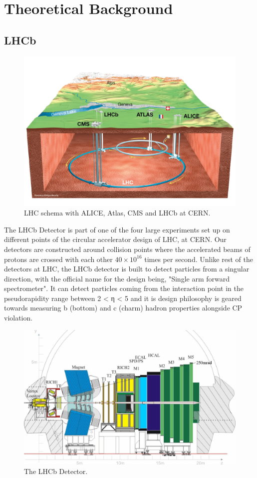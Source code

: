 \chapter{Theoretical Background}\label{chap:01}

\section{LHCb}

\begin{figure}[H]
    \centering
    \includegraphics[width=0.7\linewidth]{images/LHC_scheme.png}
    \caption{LHC schema with ALICE, Atlas, CMS and LHCb at CERN.}
    \label{LHC}
\end{figure}

The LHCb Detector is part of one of the four large experiments set up on different points of the circular accelerator design of LHC, at CERN. Our detectors are constructed around collision points where the accelerated beams of protons are crossed with each other \( 40 \times 10^{16} \) times per second. Unlike rest of the detectors at LHC, the LHCb detector is built to detect particles from a singular direction, with the official name for the design being, "Single arm forward spectrometer". It can detect particles coming from the interaction point in the pseudorapidity range between 2 < η < 5 and it is design philosophy is geared towards measuring b (bottom) and c (charm) hadron properties alongside CP violation. \cite{LHCb_detector}


\begin{figure}[H]
    \centering
    \includegraphics[width=0.7\linewidth]{images/LHCb_diagram.png}
    \caption{The LHCb Detector.}
    \label{LHCb}
\end{figure}

